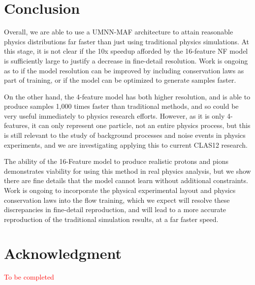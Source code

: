 \documentclass[conference]{IEEEtran}
\begin{document}
\section{Conclusion}

Overall, we are able to use a UMNN-MAF architecture to attain reasonable physics distributions far faster than just using traditional physics simulations. At this stage, it is not clear if the 10x speedup afforded by the 16-feature NF model is sufficiently large to justify a decrease in fine-detail resolution. Work is ongoing as to if the model resolution can be improved by including conservation laws as part of training, or if the model can be optimized to generate samples faster. 

On the other hand, the 4-feature model has both higher resolution, and is able to produce samples 1,000 times faster than traditional methods, and so could be very useful immediately to physics research efforts. However, as it is only 4-features, it can only represent one particle, not an entire physics process, but this is still relevant to the study of background processes and noise events in physics experiments, and we are investigating applying this to current CLAS12 research.

The ability of the 16-Feature model to produce realistic protons and pions demonstrates viability for using this method in real physics analysis, but we show there are fine details that the model cannot learn without additional constraints. Work is ongoing to incorporate the physical experimental layout and physics conservation laws into the flow training, which we expect will resolve these discrepancies in fine-detail reproduction, and will lead to a more accurate reproduction of the traditional simulation results, at a far faster speed. 



\section*{Acknowledgment}

\textcolor{red}{To be completed}



\end{document}
